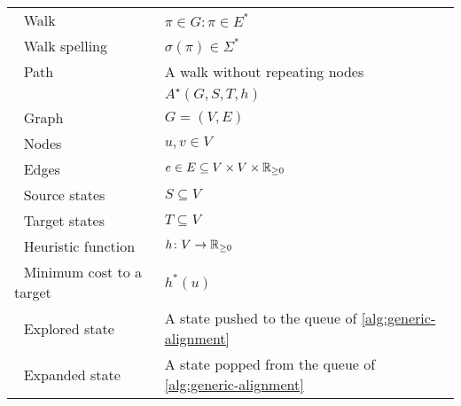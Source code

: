 \begin{table}[!h]
\begin{tabular}{ll}
	\,\, Walk& $\pi \in G: \pi \in E^*$\\
	\,\, Walk spelling& $\sigma(\pi) \in \Sigma^*$\\
	\,\, Path& A walk without repeating nodes\\
	\hline
	\textbf{\A} & $A^\star(G,S,T,h)$\\
	\,\, Graph& $G=(V,E)$\\
	\,\, Nodes& $u,v \in V$\\
	\,\, Edges& $e \in E \subseteq V \times V \times \mathbb{R}_{\geq 0}$\\ 
	\,\, Source states& $S \subseteq V$\\
	\,\, Target states& $T \subseteq V$\\
	\,\, Heuristic function& $h \colon V \to \mathbb{R}_{\geq 0}$\\
	\,\, Minimum cost to a target& $h^*(u)$\\
	\,\, Explored state & A state pushed to the queue of \cref{alg:generic-alignment}\\
	\,\, Expanded state & A state popped from the queue of \cref{alg:generic-alignment}\\
	\hline
\end{tabular}
\end{table}
